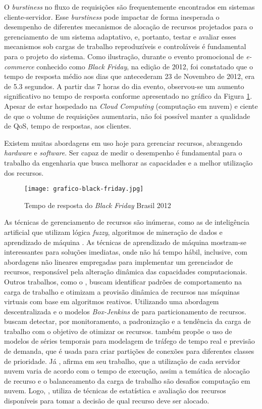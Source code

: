 O \textit{burstiness} no fluxo de requisições são frequentemente encontrados em sistemas cliente-servidor. Esse \textit{burstiness} pode impactar de forma inesperada o desempenho de diferentes mecanismos de alocação de recursos projetados para o gerenciamento de um sistema adaptativo, e, portanto, testar e avaliar esses mecanismos sob cargas de trabalho reproduzíveis e controláveis é fundamental para o projeto do sistema.  Como ilustração, durante o evento promocional de \textit{e-commerce} conhecido como \textit{Black Friday}, na edição de 2012, foi constatado que o tempo de resposta médio aos dias que antecederam 23 de Novembro de 2012, era de 5.3 segundos. A partir das 7 horas do dia evento, observou-se um aumento significativo no tempo de resposta conforme apresentado no gráfico da Figura \ref{fig:grafico-black-friday}. Apesar de estar hospedado na \textit{Cloud Computing} (computação em nuvem) e ciente de que o volume de requisições aumentaria, não foi possível manter a qualidade de QoS, tempo de respostas, aos clientes.

Existem muitas abordagens em uso hoje para gerenciar recursos, abrangendo \textit{hardware} e \textit{software}. Ser capaz de medir o desempenho é fundamental para o trabalho da engenharia que busca melhorar as capacidades e a melhor utilização dos recursos.

\begin{figure}[htb]
	\centering
	\texttt{[image: grafico-black-friday.jpg]}
	\caption{Tempo de resposta do \textit{Black Friday} Brasil 2012}
	\label{fig:grafico-black-friday}
\end{figure}

As técnicas de gerenciamento de recursos são inúmeras, como as de inteligência artificial que utilizam lógica \textit{fuzzy}, algoritmos de mineração de dados e aprendizado de máquina \cite{Nobile2013}. As técnicas de aprendizado de máquina mostram-se interessantes para soluções imediatas, onde não há tempo hábil, inclusive, com abordagens não lineares empregadas para implementar um gerenciador de recursos, responsável pela alteração dinâmica das capacidades computacionais. Outros trabalhos, como o , buscam identificar padrões de comportamento na carga de trabalho e otimizam a provisão dinâmica de recursos nas máquinas virtuais com base em algoritmos reativos. Utilizando uma abordagem descentralizada e o modelos \textit{Box-Jenkins} de  para particionamento de recursos.  buscam detectar, por monitoramento, a padronização e a tendência da carga de trabalho com o objetivo de otimizar os recursos.  também propõe o uso de modelos de séries temporais para modelagem de tráfego de tempo real e previsão de demanda, que é usada para criar partições de conexões para diferentes classes de prioridade. Já , afirma em seu trabalho, que a utilização de cada servidor nuvem varia de acordo com o tempo de execução, assim a temática de alocação de recurso e o balanceamento da carga de trabalho são desafios computação em nuvem. Logo, , utiliza de técnicas de estatística e avaliação dos recursos disponíveis para tomar a decisão de qual recurso deve ser alocado.


